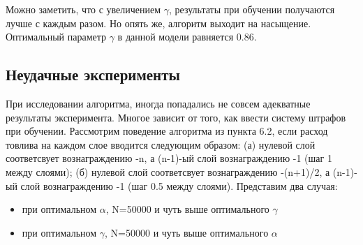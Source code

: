 \documentclass[a4paper]{report}
\theoremstyle{definition}
\theoremstyle{plain}
\theoremstyle{remark}
\theoremstyle{remark}
\theoremstyle{definition}
\begin{document}
Можно заметить, что с увеличением $\gamma$, результаты при обучении получаются лучше с каждым разом. Но опять же, алгоритм выходит на насыщение. Оптимальный параметр $\gamma$ в данной модели равняется 0.86.

\begin{center}
    \subsection{Неудачные эксперименты}
\end{center}

При исследовании алгоритма, иногда попадались не совсем адекватные результаты эксперимента. Многое зависит от того, как ввести систему штрафов при обучении. Рассмотрим поведение алгоритма из пункта 6.2, если расход товлива на каждом слое вводится следующим образом: (а) нулевой слой соответсвует вознаграждению -n, а (n-1)-ый слой вознаграждению -1 (шаг 1 между слоями); (б) нулевой слой соответсвует вознаграждению -(n+1)/2, а (n-1)-ый слой вознаграждению -1 (шаг 0.5 между слоями). Представим два случая:
\begin{itemize}
    \item при оптимальном $\alpha$, N=50000 и чуть выше оптимального $\gamma$
    \item при оптимальном $\gamma$, N=50000 и чуть выше оптимального $\alpha$
\end{itemize}
\end{document}
